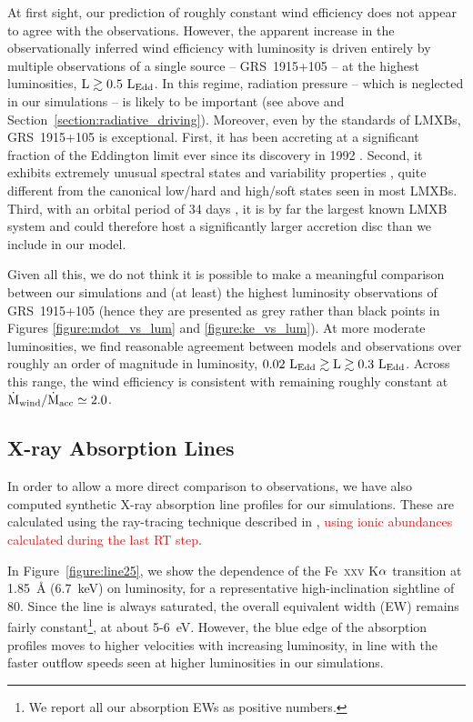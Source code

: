 \documentclass[a4paper,fleqn,usenatbib]{mnras}
\begin{document}
At first sight, our prediction of roughly constant wind efficiency
does not appear to agree with the observations. However, the apparent
increase in the observationally inferred wind efficiency with
luminosity is driven entirely by multiple observations of a single
source -- GRS~1915+105 -- at the highest
luminosities, $\rm{L \gtrsim 0.5~L_{Edd}}$. In this regime, radiation
pressure -- which is neglected in our simulations -- is likely to be
important (see above and Section~\ref{section:radiative_driving}). Moreover, even by the
standards of LMXBs, GRS~1915+105 is exceptional. First, it has been accreting
at a significant fraction of the Eddington limit ever since its
discovery in 1992
\citep{1994ApJS...92..469C,2017MNRAS.468.4748C}. Second, it exhibits
extremely unusual spectral states and variability properties
\citep[e.g.][]{2016ApJ...833..165Z}, quite different from the
canonical low/hard and high/soft states seen in most LMXBs. Third, 
with an orbital period of 34 days \citep{2014SSRv..183..223C}, it is
by far the largest known LMXB system and could therefore host a
significantly larger accretion disc than we include in our model.

Given all this, we do not think it is possible to make a meaningful
comparison between our simulations and (at least) the highest
luminosity observations of GRS~1915+105 (hence they are presented
as grey rather than black points in Figures \ref{figure:mdot_vs_lum}
and \ref{figure:ke_vs_lum}). At more moderate luminosities, 
we find reasonable agreement between models and observations over 
roughly an order of magnitude in luminosity,
$\rm{0.02~L_{Edd} \gtrsim L \gtrsim 0.3~L_{Edd}}$. Across this range,
the wind efficiency is consistent with remaining roughly constant at
$\rm{\dot{M}_{wind}/\dot{M}_{acc}} \simeq 2.0$. 

\subsection{X-ray Absorption Lines}
\label{lines}

In order to allow a more direct comparison to observations, we have
also computed synthetic X-ray absorption line profiles for our
simulations. These are calculated using the ray-tracing technique described in
\cite{2017ApJ...836...42H}, \textcolor{red}{using ionic abundances calculated
during the last RT step}.

In Figure~\ref{figure:line25}, we show the dependence of the
Fe~\textsc{xxv} K$\rm{\alpha}$ transition at 1.85~{\AA} (6.7~keV)
on luminosity, for a representative high-inclination sightline of
80\degree. Since the 
line is always saturated, the overall equivalent width (EW) remains
fairly constant\footnote{We report all our absorption
EWs as positive numbers.}, at about 5-6~eV. However, the blue edge of 
the absorption profiles moves to higher velocities with increasing
luminosity, in line with the faster outflow speeds seen at higher
luminosities in our simulations. 
\end{document}
